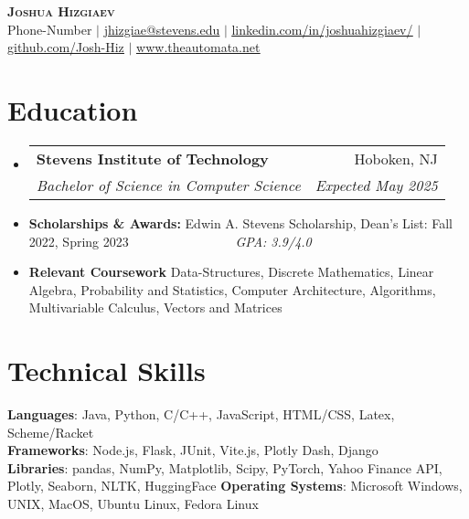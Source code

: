 \documentclass[letterpaper,11pt]{article}
\makeatletter
\newcommand{\resumeItem}[1]{
  \item\small{
    {#1 \vspace{-2pt}}
  }
}
\newcommand{\resumeSubheading}[4]{
  \vspace{-2pt}\item
    \begin{tabular*}{0.97\textwidth}[t]{l@{\extracolsep{\fill}}r}
      \textbf{#1} & #2 \\
      \textit{\small#3} & \textit{\small #4} \\
    \end{tabular*}\vspace{-7pt}
}
\newcommand{\resumeSubItem}[1]{\resumeItem{#1}\vspace{-4pt}}
\newcommand{\resumeSubHeadingListStart}{\begin{itemize}[leftmargin=0.15in, label={}]}
\newcommand{\resumeSubHeadingListEnd}{\end{itemize}}
\makeatother
\begin{document}

\begin{center}
    \textbf{\Huge \scshape Joshua Hizgiaev} \\ \vspace{1pt}
    \small Phone-Number $|$ \href{mailto:jhizgiae@stevens.edu}{\underline{jhizgiae@stevens.edu}} $|$ 
    \href{https://linkedin.com/in/joshuahizgiaev/}{\underline{linkedin.com/in/joshuahizgiaev/}} $|$
    \href{https://github.com/Josh-Hiz}{\underline{github.com/Josh-Hiz}} $|$
    \href{https://www.theautomata.net/}{\underline{www.theautomata.net}}
\end{center}


\section{Education}
  \resumeSubHeadingListStart
    \resumeSubheading
      {Stevens Institute of Technology}{Hoboken, NJ}
      {Bachelor of Science in Computer Science}{Expected May 2025}
    \resumeSubItem{\textbf{Scholarships \& Awards: }Edwin A. Stevens Scholarship, Dean's List: Fall 2022, Spring 2023 \ \ \ \ \ \ \ \ \ \ \ \ \ \ \ \ \textit{GPA: 3.9/4.0}}
    \resumeSubItem{\textbf{Relevant Coursework }Data-Structures, Discrete Mathematics, Linear Algebra, Probability and Statistics, Computer Architecture, Algorithms, Multivariable Calculus, Vectors and Matrices}
  \resumeSubHeadingListEnd

%
\section{Technical Skills}
 \begin{itemize}[leftmargin=0.15in, label={}]
    \small{\item{
     \textbf{Languages}{: Java, Python, C/C++, JavaScript, HTML/CSS, Latex, Scheme/Racket} \\
     \textbf{Frameworks}{: Node.js, Flask, JUnit, Vite.js, Plotly Dash, Django} \\
     \textbf{Libraries}{: pandas, NumPy, Matplotlib, Scipy, PyTorch, Yahoo Finance API, Plotly, Seaborn, NLTK, HuggingFace}
     \textbf{Operating Systems}{: Microsoft Windows, UNIX, MacOS, Ubuntu Linux, Fedora Linux}
    }}
 \end{itemize}
\end{document}
